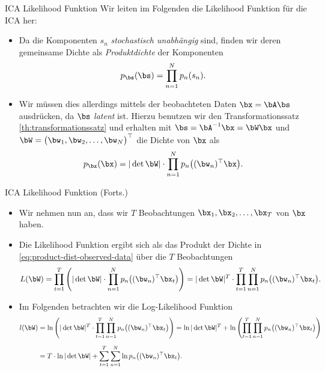 \begin{frame}{ICA Likelihood Funktion}{}
	Wir leiten im Folgenden die Likelihood Funktion für die ICA her:
	
	\begin{itemize}
		\item Da die Komponenten $s_n$ \textit{stochastisch unabhängig} sind, finden wir deren gemeinsame Dichte als
			\textit{Produktdichte} der Komponenten $$p_{\bs}(\bs) = \prod_{n=1}^N p_n(s_n).$$
		\item Wir müssen dies allerdings mittels der beobachteten Daten $\bx = \bA \bs$ ausdrücken, da $\bs$ \textit{latent} ist.
			Hierzu benutzen wir den Transformationssatz \ref{th:transformationssatz} und erhalten mit
			$\bs = \bA^{-1} \bx = \bW \bx$ und
			$\bW = \bigl( \bw_1, \bw_2, \ldots, \bw_N \bigr)^\top$ die Dichte von $\bx$ als
		\begin{equation} \label{eq:product-dist-observed-data}
			p_{\bx}(\bx) = \vert \det \bW \vert \cdot \prod_{n=1}^N p_n\bigl( (\bw_n)^\top \bx \bigr).
		\end{equation}
	\end{itemize}
\end{frame}


\begin{frame}{ICA Likelihood Funktion (Forts.)}{}	
	\begin{itemize}
		\item Wir nehmen nun an, dass wir $T$ Beobachtungen $\bx_1, \bx_2, \ldots, \bx_T$ von $\bx$ haben.
		\item Die Likelihood Funktion ergibt sich als das Produkt der Dichte in \eqref{eq:product-dist-observed-data}
		über die $T$ Beobachtungen
		\begin{equation*}
			L(\bW)
				= \prod_{t=1}^T \left( \vert \det \bW \vert \cdot \prod_{n=1}^N p_n\bigl( (\bw_n)^\top \bx_t \bigr) \right)
				= \vert \det \bW \vert^T \cdot \prod_{t=1}^T \prod_{n=1}^N p_n\bigl( (\bw_n)^\top \bx_t \bigr).
		\end{equation*}
		\item Im Folgenden betrachten wir die Log-Likelihood Funktion
		\begin{align*}
			l(\bW)
				&= \ln\left(
					\vert \det \bW \vert^T \cdot \prod_{t=1}^T \prod_{n=1}^N p_n\bigl( (\bw_n)^\top \bx_t \bigr)
				\right)
					= \ln \vert \det \bW \vert^T + \ln\left(
						\prod_{t=1}^T \prod_{n=1}^N p_n\bigl( (\bw_n)^\top \bx_t \bigr)
					\right)
		\\[2mm]
				&= T \cdot \ln \vert \det \bW \vert + \sum_{t=1}^T \sum_{n=1}^N \ln p_n\bigl( (\bw_n)^\top \bx_t \bigr).
		\end{align*}
	\end{itemize}
\end{frame}


